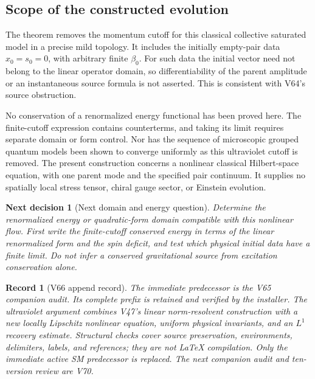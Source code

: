 \documentclass[11pt]{article}
\newtheorem{decision}[theorem]{Next decision}
\newtheorem{record}[theorem]{Record}
\theoremstyle{remark}
\begin{document}
\subsection{Scope of the constructed evolution}

The theorem removes the momentum cutoff for this
classical collective saturated model in a precise mild
topology.  It includes the initially empty-pair data
\(x_0=s_0=0\), with arbitrary finite \(\beta_0\).
For such data the initial vector need not belong to
the linear operator domain, so differentiability of
the parent amplitude or an instantaneous source
formula is not asserted.  This is consistent with
V64's source obstruction.

No conservation of a renormalized energy functional
has been proved here.  The finite-cutoff expression
contains counterterms, and taking its limit requires
separate domain or form control.  Nor has the sequence
of microscopic grouped quantum models been shown to
converge uniformly as this ultraviolet cutoff is
removed.  The present construction concerns a
nonlinear classical Hilbert-space equation, with
one parent mode and the specified pair continuum.
It supplies no spatially local stress tensor, chiral
gauge sector, or Einstein evolution.

\begin{decision}[Next domain and energy question]
\label{dec:v20v66-next}
Determine the renormalized energy or quadratic-form
domain compatible with this nonlinear flow.  First
write the finite-cutoff conserved energy in terms
of the linear renormalized form and the spin deficit,
and test which physical initial data have a finite
limit.  Do not infer a conserved gravitational source
from excitation conservation alone.
\end{decision}

\begin{record}[V66 append record]
\label{rec:v20v66}
The immediate predecessor is the V65 companion audit.
Its complete prefix is retained and verified by the
installer.  The ultraviolet argument combines V47's
linear norm-resolvent construction with a new
locally Lipschitz nonlinear equation, uniform physical
invariants, and an \(L^1\) recovery estimate.
Structural checks cover source preservation,
environments, delimiters, labels, and references;
they are not LaTeX compilation.
Only the immediate active SM predecessor is replaced.
The next companion audit and ten-version review are V70.
\end{record}
\end{document}
